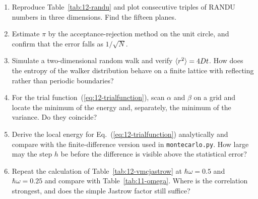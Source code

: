 \begin{enumerate}
  \item[a)] Reproduce Table~\ref{tab:12-randu} and plot consecutive triples of
  RANDU numbers in three dimensions.  Find the fifteen planes.
  \item[b)] Estimate $\pi$ by the acceptance-rejection method on the unit
  circle, and confirm that the error falls as $1/\sqrt{N}$.
  \item[c)] Simulate a two-dimensional random walk and verify
  $\langle r^2 \rangle=4Dt$.  How does the entropy of the walker distribution behave on
  a finite lattice with reflecting rather than periodic boundaries?
  \item[d)] For the trial function~(\ref{eq:12-trialfunction}), scan $\alpha$
  and $\beta$ on a grid and locate the minimum of the energy and, separately,
  the minimum of the variance.  Do they coincide?
  \item[e)] Derive the local energy for Eq.~(\ref{eq:12-trialfunction})
  analytically and compare with the finite-difference version used in
  \texttt{montecarlo.py}.  How large may the step $h$ be before the difference
  is visible above the statistical error?
  \item[f)] Repeat the calculation of Table~\ref{tab:12-vmcjastrow} at
  $\hbar\omega=0.5$ and $\hbar\omega=0.25$ and compare with
  Table~\ref{tab:11-omega}.  Where is the correlation strongest, and does the
  simple Jastrow factor still suffice?
\end{enumerate}
